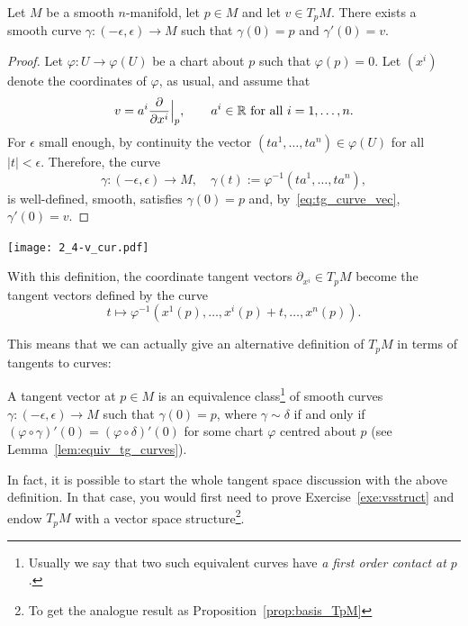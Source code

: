 \begin{theorem}
	Let $M$ be a smooth $n$-manifold, let $p\in M$ and let $v\in T_pM$.
	There exists a smooth curve $\gamma: (-\epsilon,\epsilon) \to M$ such that $\gamma(0)=p$ and $\gamma'(0) = v$.
\end{theorem}
\begin{proof}
	Let $\varphi:U\to\varphi(U)$ be a chart about $p$ such that $\varphi(p)=0$.
	Let $(x^i)$ denote the coordinates of $\varphi$, as usual, and assume that
	\begin{equation}
		v = a^i \frac{\partial}{\partial x^i}\Big|_p, \qquad a^i \in\mathbb{R} \mbox{ for all } i=1,\ldots,n.
	\end{equation}
	For $\epsilon$ small enough, by continuity the vector $(ta^1, \ldots, ta^n) \in \varphi(U)$ for all $|t|<\epsilon$. Therefore, the curve
	\begin{equation}
		\gamma: (-\epsilon, \epsilon) \to M, \quad \gamma(t):=\varphi^{-1}(ta^1, \ldots, ta^n),
	\end{equation}
	is well-defined, smooth, satisfies $\gamma(0) = p$ and, by~\eqref{eq:tg_curve_vec}, $\gamma'(0) = v$.
\end{proof}

\begin{marginfigure}
	\texttt{[image: 2\_4-v\_cur.pdf]}
	\caption{With this definition, the coordinate tangent vectors $\partial_{x^i}\in T_p M$ become the tangent vectors defined by the curve \[t \mapsto \varphi^{-1}(x^1(p), \ldots, {x^i(p) + t}, \ldots, x^n(p)).\]}
	\label{fig:2_4-v_cur}
\end{marginfigure}
This means that we can actually give an alternative definition of $T_pM$ in terms of tangents to curves:
\begin{definition}\label{def:tg:ascurvespeed}
	A tangent vector at $p\in M$ is an equivalence class\footnote{Usually we say that two such equivalent curves have \emph{a first order contact at $p$}.} of smooth curves $\gamma:(-\epsilon, \epsilon)\to M$ such that $\gamma(0)=p$, where $\gamma\sim\delta$ if and only if $(\varphi\circ \gamma)'(0) = (\varphi\circ\delta)'(0)$ for some chart $\varphi$ centred about $p$ (see Lemma~\ref{lem:equiv_tg_curves}).
\end{definition}

In fact, it is possible to start the whole tangent space discussion with the above definition. In that case, you would first need to prove Exercise~\ref{exe:vsstruct} and endow $T_pM$ with a vector space structure\footnote{To get the analogue result as Proposition~\ref{prop:basis_TpM}}.

